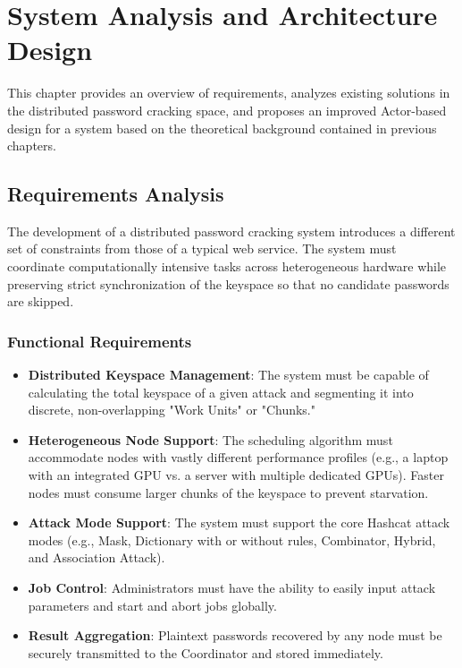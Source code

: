 \chapter{System Analysis and Architecture Design}
\label{chap:analysis}

This chapter provides an overview of requirements, analyzes existing solutions in the distributed password cracking space, and proposes an improved Actor-based design for a system based on the theoretical background contained in previous chapters.

\section{Requirements Analysis}

The development of a distributed password cracking system introduces a different set of constraints from those of a typical web service. The system must coordinate computationally intensive tasks across heterogeneous hardware while preserving strict synchronization of the keyspace so that no candidate passwords are skipped.

\subsection{Functional Requirements}

\begin{itemize}
    \item \textbf{Distributed Keyspace Management}: The system must be capable of calculating the total keyspace of a given attack and segmenting it into discrete, non-overlapping "Work Units" or "Chunks."

    \item \textbf{Heterogeneous Node Support}: The scheduling algorithm must accommodate nodes with vastly different performance profiles (e.g., a laptop with an integrated GPU vs. a server with multiple dedicated GPUs). Faster nodes must consume larger chunks of the keyspace to prevent starvation.

    \item \textbf{Attack Mode Support}: The system must support the core Hashcat attack modes (e.g., Mask, Dictionary with or without rules, Combinator, Hybrid, and Association Attack).

    \item \textbf{Job Control}: Administrators must have the ability to easily input attack parameters and start and abort jobs globally.

    \item \textbf{Result Aggregation}: Plaintext passwords recovered by any node must be securely transmitted to the Coordinator and stored immediately.
\end{itemize}

